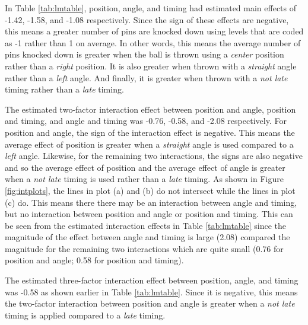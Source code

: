 \documentclass[
]{article}
\begin{document}
In Table \ref{tab:lmtable}, position, angle, and timing had estimated main effects of -1.42, -1.58, and -1.08 respectively. Since the sign of these effects are negative, this means a greater number of pins are knocked down using levels that are coded as -1 rather than 1 on average. In other words, this means the average number of pins knocked down is greater when the ball is thrown using a \emph{center} position rather than a \emph{right} position. It is also greater when thrown with a \emph{straight} angle rather than a \emph{left} angle. And finally, it is greater when thrown with a \emph{not late} timing rather than a \emph{late} timing.

The estimated two-factor interaction effect between position and angle, position and timing, and angle and timing was -0.76, -0.58, and -2.08 respectively. For position and angle, the sign of the interaction effect is negative. This means the average effect of position is greater when a \emph{straight} angle is used compared to a \emph{left} angle. Likewise, for the remaining two interactions, the signs are also negative and so the average effect of position and the average effect of angle is greater when a \emph{not late} timing is used rather than a \emph{late} timing. As shown in Figure \ref{fig:intplots}, the lines in plot (a) and (b) do not intersect while the lines in plot (c) do. This means there there may be an interaction between angle and timing, but no interaction between position and angle or position and timing. This can be seen from the estimated interaction effects in Table \ref{tab:lmtable} since the magnitude of the effect between angle and timing is large (2.08) compared the magnitude for the remaining two interactions which are quite small (0.76 for position and angle; 0.58 for position and timing).

The estimated three-factor interaction effect between position, angle, and timing was -0.58 as shown earlier in Table \ref{tab:lmtable}. Since it is negative, this means the two-factor interaction between position and angle is greater when a \emph{not late} timing is applied compared to a \emph{late} timing.
\end{document}
